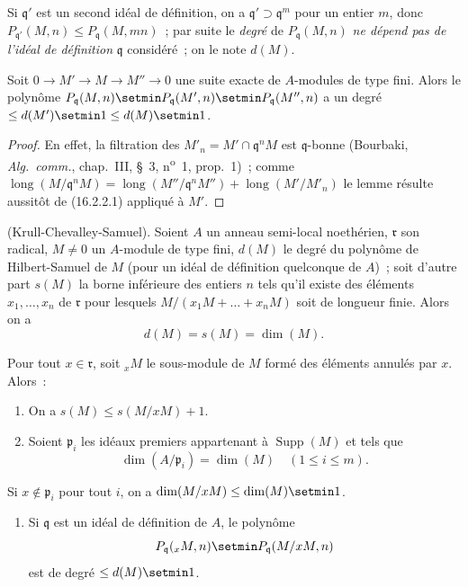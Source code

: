 Si $\mathfrak{q}'$ est un second idéal de définition, on a
$\mathfrak{q}'\supset\mathfrak{q}^m$ pour un entier $m$, donc
$P_{\mathfrak{q}'}(M,n)\leq P_{\mathfrak{q}}(M,mn)$~; par suite le \emph{degré} de
$P_{\mathfrak{q}}(M,n)$ \emph{ne dépend pas de l'idéal de définition}
$\mathfrak{q}$ considéré~; on le note $d(M)$.

\begin{lemma}[16.2.2.2]
\label{0.16.2.2.2-fr}
Soit $0\to M'\to M\to M''\to0$ une suite exacte de $A$-modules de type
fini. Alors le polynôme
$P_{\mathfrak{q}}(M,n)\setmin P_{\mathfrak{q}}(M',n)\setmin P_{\mathfrak{q}}(M'',n)$
a un degré $\leq d(M')\setmin 1\leq d(M)\setmin 1$.
\end{lemma}

\begin{proof}
En effet, la filtration des
$M'_n=M'\cap\mathfrak{q}^nM$ est $\mathfrak{q}$-bonne (Bourbaki,
\emph{Alg.~comm.}, chap.~III, \S~3, n\textsuperscript{o}~1, prop.~1)~; comme
$\operatorname{long}(M/\mathfrak{q}^nM)=\operatorname{long}(M''/\mathfrak{q}^nM'')+\operatorname{long}(M'/M'_n)$
le lemme résulte aussitôt de (16.2.2.1) appliqué à $M'$.
\end{proof}

\begin{theorem}[16.2.3]
\label{0.16.2.3-fr}
\textup{(Krull-Chevalley-Samuel).}
Soient $A$ un anneau semi-local noethérien, $\mathfrak{r}$ son radical,
$M\neq0$ un $A$-module de type fini, $d(M)$ le degré du polynôme de
Hilbert-Samuel de $M$ (pour un idéal de définition quelconque de $A$)~; soit
d'autre part $s(M)$ la borne inférieure des entiers $n$ tels qu'il existe des
éléments $x_1,\ldots,x_n$ de $\mathfrak{r}$ pour lesquels
$M/(x_1M+\ldots+x_nM)$ soit de longueur finie. Alors on a
\[
  d(M)=s(M)=\dim(M).
\]
\end{theorem}

\begin{lemma}[16.2.3.1]
\label{0.16.2.3.1-fr}
Pour tout $x\in\mathfrak{r}$, soit ${}_xM$ le sous-module de $M$ formé des
éléments annulés par $x$. Alors~:
\begin{enumerate}
  \item[\rm{(i)}] On a $s(M)\leq s(M/xM)+1$.
  \item[\rm{(ii)}] Soient $\mathfrak{p}_i$ les idéaux premiers appartenant à
  $\operatorname{Supp}(M)$ et tels que
  \[
    \dim(A/\mathfrak{p}_i)=\dim(M)\quad(1\leq i\leq m).
  \]
\end{enumerate}
Si $x\notin\mathfrak{p}_i$ pour tout $i$, on a
$\dim(M/xM)\leq\dim(M)\setmin 1$.
\begin{enumerate}
  \item[\rm{(iii)}] Si $\mathfrak{q}$ est un idéal de définition de $A$, le
  polynôme
  \[
    P_{\mathfrak{q}}({}_xM,n)\setmin P_{\mathfrak{q}}(M/xM,n)
  \]
  est de degré $\leq d(M)\setmin 1$.
\end{enumerate}
\end{lemma}

